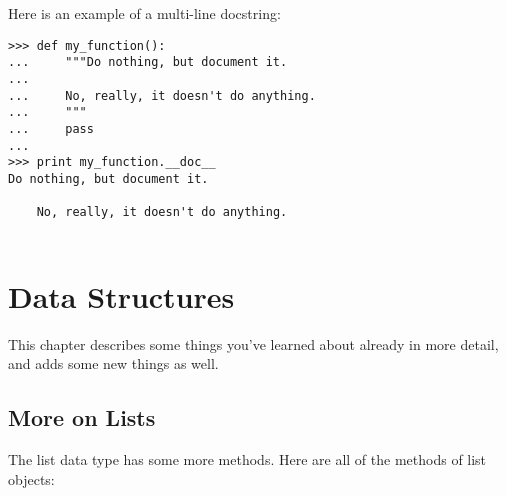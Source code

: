 \documentclass{manual}
\begin{document}
Here is an example of a multi-line docstring:

\begin{verbatim}
>>> def my_function():
...     """Do nothing, but document it.
... 
...     No, really, it doesn't do anything.
...     """
...     pass
... 
>>> print my_function.__doc__
Do nothing, but document it.

    No, really, it doesn't do anything.
    
\end{verbatim}



\chapter{Data Structures \label{structures}}

This chapter describes some things you've learned about already in
more detail, and adds some new things as well.


\section{More on Lists \label{moreLists}}

The list data type has some more methods.  Here are all of the methods
of list objects:
\end{document}
